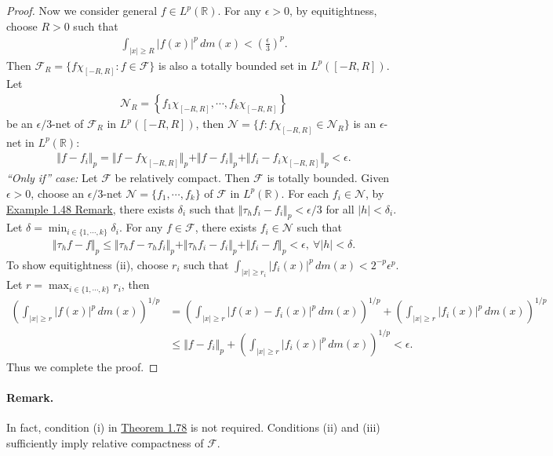 \documentclass{article}
\begin{document}
\begin{proof}
Now we consider general $f\in L^p(\mathbb{R})$. For any $\epsilon>0$, by equitightness, choose $R>0$ such that
\begin{align*}
	\int_{\vert x\vert \geq R}\vert f(x)\vert^p\,dm(x) < \left(\frac{\epsilon}{3}\right)^p.
\end{align*}
Then $\mathcal{F}_R=\{f\chi_{[-R,R]}:f\in\mathcal{F}\}$ is also a totally bounded set in $L^p([-R,R])$. Let  
\begin{align*}
\mathcal{N}_R=\left\{f_1\chi_{[-R,R]},\cdots,f_k\chi_{[-R,R]}\right\}
\end{align*}
be an $\epsilon/3$-net of $\mathcal{F}_R$ in $L^p([-R,R])$, then $\mathcal{N}=\{f:f\chi_{[-R,R]}\in\mathcal{N}_R\}$ is an $\epsilon$-net in $L^p(\mathbb{R})$:
\begin{align*}
	\Vert f - f_i\Vert_p = \Vert f - f\chi_{[-R,R]}\Vert_p + \Vert f - f_i\Vert_p + \Vert f_i - f_i\chi_{[-R,R]}\Vert_p < \epsilon. 
\end{align*}
\textit{``Only if'' case:} Let $\mathcal{F}$ be relatively compact. Then $\mathcal{F}$ is totally bounded. Given $\epsilon>0$, choose an $\epsilon/3$-net $\mathcal{N}=\{f_1,\cdots,f_k\}$ of $\mathcal{F}$ in $L^p(\mathbb{R})$. For each $f_i\in\mathcal{N}$, by \hyperref[example:1.48]{Example 1.48 Remark}, there exists $\delta_i$ such that $\Vert\tau_h f_i - f_i\Vert_p < \epsilon/3$ for all $\vert h\vert < \delta_i$. Let $\delta=\min_{i\in\{1,\cdots,k\}}\delta_i$. For any $f\in\mathcal{F}$, there exists $f_i\in\mathcal{N}$ such that
\begin{align*}
	\Vert\tau_h f - f\Vert_p \leq \Vert\tau_h f - \tau_h f_i\Vert_p + \Vert \tau_h f_i - f_i\Vert_p + \Vert f_i - f\Vert_p < \epsilon,\ \forall \vert h\vert < \delta. \tag{iii}
\end{align*}
To show equitightness (ii), choose $r_i$ such that $\int_{\vert x\vert\geq r_i}\vert f_i(x)\vert^p\,dm(x)<2^{-p}\epsilon^p$. Let $r=\max_{i\in\{1,\cdots,k\}}r_i$, then
\begin{align*}
	\left(\int_{\vert x\vert\geq r}\vert f(x)\vert^p\,dm(x)\right)^{1/p} &= \left(\int_{\vert x\vert\geq r}\vert f(x) - f_i(x)\vert^p\,dm(x)\right)^{1/p} + \left(\int_{\vert x\vert\geq r}\vert f_i(x)\vert^p\,dm(x)\right)^{1/p}\\
	&\leq \Vert f-f_i\Vert_p + \left(\int_{\vert x\vert\geq r}\vert f_i(x)\vert^p\,dm(x)\right)^{1/p} < \epsilon.
\end{align*}
Thus we complete the proof.
\end{proof}
\paragraph{Remark.} In fact, condition (i) in \hyperref[thm:1.78]{Theorem 1.78} is not required. Conditions (ii) and (iii) sufficiently imply relative compactness of $\mathcal{F}$.
\end{document}
